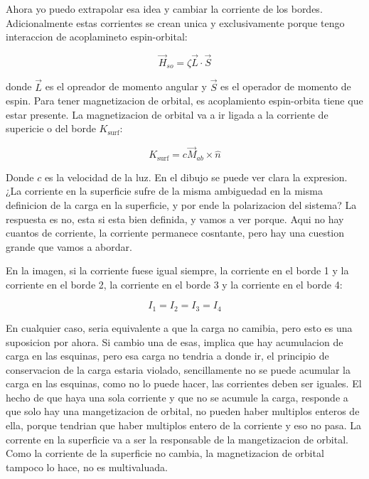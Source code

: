 \documentclass[11pt,fleqn]{book}
\begin{document}
Ahora  yo puedo extrapolar esa idea y cambiar la corriente de los bordes. Adicionalmente estas corrientes se crean unica y exclusivamente porque tengo interaccion de acoplamineto espin-orbital:

\begin{equation}
    \vec{H}_{so}=\zeta\vec{L}\cdot\vec{S}
\end{equation}


donde $\vec{L}$ es el opreador de momento angular y $\vec{S}$ es el operador de momento de espin. Para tener magnetizacion de orbital, es acoplamiento espin-orbita tiene que estar presente. La magnetizacion de orbital va a ir ligada a la corriente de supericie o del borde $K_{\text{surf}}$:

\begin{equation}
    K_{\text{surf}}=c\vec{M}_{ab}\times\hat{n}
\end{equation}

Donde $c$ es la velocidad de la luz. En el dibujo se puede ver clara la expresion. ¿La corriente en la superficie sufre de la misma ambiguedad en la misma definicion de la carga en la superficie, y por ende la polarizacion del sistema? La respuesta es no, esta si esta bien definida, y vamos a ver porque. Aqui no hay cuantos de corriente, la corriente permanece cosntante, pero hay una cuestion grande que vamos a abordar.

En la imagen, si la corriente fuese igual siempre, la corriente en el borde 1 y la corriente en el borde 2, la corriente en el borde 3 y la corriente en el borde 4:

\begin{equation}
    I_{1}=I_{2}=I_{3}=I_{4}
\end{equation}

En cualquier caso, seria equivalente a que la carga no camibia, pero esto es una suposicion por ahora. Si cambio una de esas, implica que hay acumulacion de carga en las esquinas, pero esa carga no tendria a donde ir, el principio de conservacion de la carga estaria violado, sencillamente no se puede acumular la carga en las esquinas, como no lo puede hacer, las corrientes deben ser iguales. El hecho de que haya una sola corriente y que no se acumule  la carga, responde a que solo hay una mangetizacion de orbital, no pueden haber multiplos enteros de ella, porque tendrian que haber multiplos entero de la corriente y eso no pasa. La corrente en la superficie va a ser la responsable de la mangetizacion de orbital. Como la corriente de la superficie no cambia, la magnetizacion de orbital tampoco lo hace, no es multivaluada. 
\end{document}
